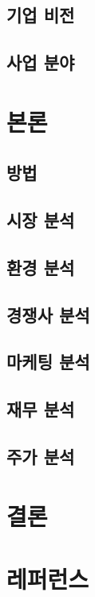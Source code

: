 \documentclass{oblivoir}
\begin{document}
		\subsection{기업 비전}
		
		\subsection{사업 분야}
	
	\section{본론}
		\subsection{방법}
		
		\subsection{시장 분석}
		
		\subsection{환경 분석}
		
		\subsection{경쟁사 분석}
		
		\subsection{마케팅 분석}
		
		\subsection{재무 분석}
		
		\subsection{주가 분석}
	
	\section{결론}
	
	\section{레퍼런스}
	
\end{document}
